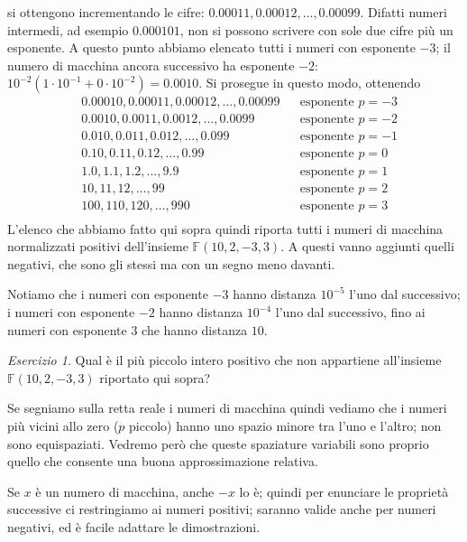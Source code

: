 \documentclass[a4paper]{report}
\theoremstyle{definiton}
\theoremstyle{remark}
\newtheorem{esercizio}[theorem]{Esercizio}
\begin{document}
si ottengono incrementando le cifre: $0.00011, 0.00012, \dots, 0.00099$. Difatti numeri intermedi, ad esempio $0.000101$, non si possono scrivere con sole due cifre più un esponente. A questo punto abbiamo elencato tutti i numeri con esponente $-3$; il numero di macchina ancora successivo ha esponente $-2$: $10^{-2}(1 \cdot 10^{-1} + 0 \cdot 10^{-2}) = 0.0010$. Si prosegue in questo modo, ottenendo
\begin{align*}
    &0.00010, 0.00011, 0.00012, \dots, 0.00099 & & \text{esponente $p=-3$}\\
    &0.0010, 0.0011, 0.0012, \dots, 0.0099 & & \text{esponente $p=-2$}\\
    &0.010, 0.011, 0.012, \dots, 0.099 & & \text{esponente $p=-1$}\\
    &0.10, 0.11, 0.12, \dots, 0.99 & & \text{esponente $p=0$}\\
    &1.0, 1.1, 1.2, \dots, 9.9 & & \text{esponente $p=1$}\\
    &10, 11, 12, \dots, 99 & & \text{esponente $p=2$}\\
    &100, 110, 120, \dots, 990 & & \text{esponente $p=3$}\\
\end{align*}
L'elenco che abbiamo fatto qui sopra quindi riporta tutti i numeri di macchina normalizzati positivi dell'insieme $\mathbb{F}(10, 2, -3, 3)$. A questi vanno aggiunti quelli negativi, che sono gli stessi ma con un segno meno davanti.

Notiamo che i numeri con esponente $-3$ hanno distanza $10^{-5}$ l'uno dal successivo; i numeri con esponente $-2$ hanno distanza $10^{-4}$ l'uno dal successivo, fino ai numeri con esponente $3$ che hanno distanza $10$.

\begin{esercizio}
    Qual è il più piccolo intero positivo che non appartiene all'insieme $\mathbb{F}(10, 2, -3, 3)$ riportato qui sopra?
\end{esercizio}
    
Se segniamo sulla retta reale i numeri di macchina quindi vediamo che i numeri più vicini allo zero ($p$ piccolo) hanno uno spazio minore tra l'uno e l'altro; non sono equispaziati. Vedremo però che queste spaziature variabili sono proprio quello che consente una buona approssimazione relativa.


Se $x$ è un numero di macchina, anche $-x$ lo è; quindi per enunciare le proprietà successive ci restringiamo ai numeri positivi; saranno valide anche per numeri negativi, ed è facile adattare le dimostrazioni.
\end{document}
